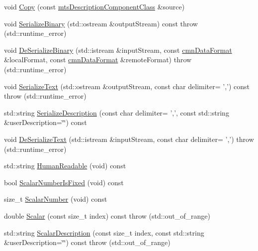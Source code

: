 \begin{DoxyCompactItemize}
void \hyperlink{classmts_description_component_class_a5523bbfb439a4ccfbd8287dfb0b6a36c}{Copy} (const \hyperlink{classmts_description_component_class}{mts\-Description\-Component\-Class} \&source)
\item 
void \hyperlink{classmts_description_component_class_a3b475eb7a270a3b8a7b97235b039118c}{Serialize\-Binary} (std\-::ostream \&output\-Stream) const   throw (std\-::runtime\-\_\-error)
\item 
void \hyperlink{classmts_description_component_class_ac38c93369c3e29bf8b8cc82e70ed205d}{De\-Serialize\-Binary} (std\-::istream \&input\-Stream, const \hyperlink{classcmn_data_format}{cmn\-Data\-Format} \&local\-Format, const \hyperlink{classcmn_data_format}{cmn\-Data\-Format} \&remote\-Format)  throw (std\-::runtime\-\_\-error)
\item 
void \hyperlink{classmts_description_component_class_a81e50daceabb34ec90c26c3f40219dd0}{Serialize\-Text} (std\-::ostream \&output\-Stream, const char delimiter= ',') const   throw (std\-::runtime\-\_\-error)
\item 
std\-::string \hyperlink{classmts_description_component_class_aa15b49ff92c3f2e129b4d123df42c305}{Serialize\-Description} (const char delimiter= ',', const std\-::string \&user\-Description=\char`\"{}\char`\"{}) const 
\item 
void \hyperlink{classmts_description_component_class_a1f6b20c2466c540e86555c93a57a87d0}{De\-Serialize\-Text} (std\-::istream \&input\-Stream, const char delimiter= ',')  throw (std\-::runtime\-\_\-error)
\item 
std\-::string \hyperlink{classmts_description_component_class_a9f7f4fdc47b4c68703ffa12198abd055}{Human\-Readable} (void) const 
\item 
bool \hyperlink{classmts_description_component_class_a5949e16c6e792b1a0374f1dc22386080}{Scalar\-Number\-Is\-Fixed} (void) const 
\item 
size\-\_\-t \hyperlink{classmts_description_component_class_ac2d23b28060d28d94e704c2d510104d2}{Scalar\-Number} (void) const 
\item 
double \hyperlink{classmts_description_component_class_adb3e64dfa6d66a1d5f93e2ccefc4a7a8}{Scalar} (const size\-\_\-t index) const   throw (std\-::out\-\_\-of\-\_\-range)
\item 
std\-::string \hyperlink{classmts_description_component_class_aad7a72ad373e0c6cf4be445a658db6a1}{Scalar\-Description} (const size\-\_\-t index, const std\-::string \&user\-Description=\char`\"{}\char`\"{}) const   throw (std\-::out\-\_\-of\-\_\-range)
\end{DoxyCompactItemize}
